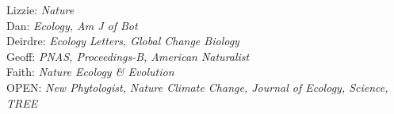 \documentclass[11pt]{article}
\begin{document}
Lizzie: \emph{Nature}\\
Dan: \emph{Ecology, Am J of Bot }\\
Deirdre: \emph{Ecology Letters, Global Change Biology}\\
Geoff: \emph{PNAS, Proceedings-B, American Naturalist} \\
Faith: \emph{Nature Ecology \& Evolution}\\
OPEN: \emph{New Phytologist, Nature Climate Change, Journal of Ecology, Science, TREE}\\
\end{document}
